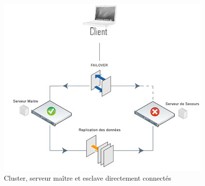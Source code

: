 \begin{figure}[!h]
\centering
 \includegraphics[scale=0.9]{Images/SchemaCluster.png}
 \caption{Cluster, serveur maître et esclave directement connectés}
 \label{schemacluster}
\end{figure}


%		
%


\newpage

